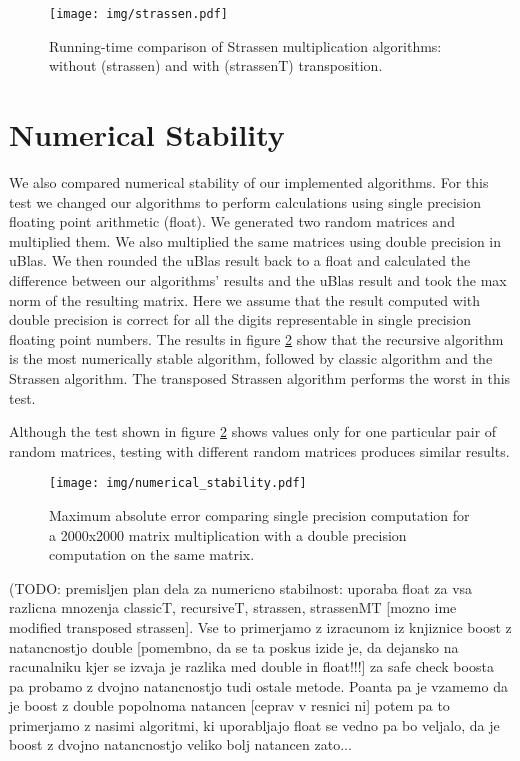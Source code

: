 \documentclass[a4paper,11pt]{article}
\begin{document}

\begin{figure}[h]
\centering
\texttt{[image: img/strassen.pdf]}
\caption{Running-time comparison of Strassen multiplication algorithms: without (\textsf{strassen}) and with (\textsf{strassenT}) transposition.}
\label{fig:strassen}
\end{figure}

\section{Numerical Stability}

We also compared numerical stability of our implemented algorithms. For this test we changed our algorithms to perform calculations using single precision floating point arithmetic (float). We generated two random matrices and multiplied them. We also multiplied the same matrices using double precision in uBlas. We then rounded the uBlas result back to a float and calculated the difference between our algorithms' results and the uBlas result and took the max norm of the resulting matrix. Here we assume that the result computed with double precision is correct for all the digits representable in single precision floating point numbers. The results in figure \ref{fig:num_stab} show that the recursive algorithm is the most numerically stable algorithm, followed by classic algorithm and the Strassen algorithm. The transposed Strassen algorithm performs the worst in this test.

Although the test shown in figure \ref{fig:num_stab} shows values only for one particular pair of random matrices, testing with different random matrices produces similar results.

\begin{figure}[h]
\centering
\texttt{[image: img/numerical\_stability.pdf]}
\caption{Maximum absolute error comparing single precision computation for a 2000x2000 matrix multiplication with a double precision computation on the same matrix. }
\label{fig:num_stab}
\end{figure}


(TODO: premisljen plan dela za numericno stabilnost:
uporaba float za vsa razlicna mnozenja
classicT,
recursiveT,
strassen,
strassenMT [mozno ime modified transposed strassen].
Vse to primerjamo z izracunom iz knjiznice boost z 
natancnostjo double [pomembno, da se ta poskus izide je, 
da dejansko na racunalniku kjer se izvaja je razlika med 
double in float!!!]
za safe check boosta pa probamo z dvojno natancnostjo tudi ostale metode.
Poanta pa je vzamemo da je boost z double popolnoma natancen [ceprav v resnici ni] potem pa to primerjamo z nasimi algoritmi, ki uporabljajo float
se vedno pa bo veljalo, da je boost z dvojno natancnostjo veliko bolj natancen zato...
\end{document}
